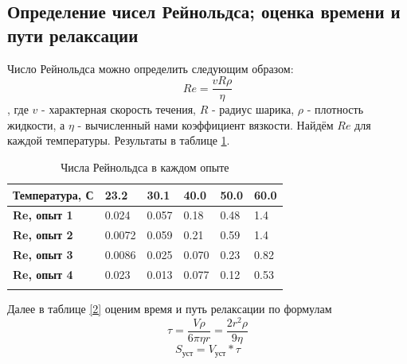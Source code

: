 \documentclass[a4paper]{article}
\begin{document}
\subsection{Определение чисел Рейнольдса; оценка времени и пути релаксации}
Число Рейнольдса можно определить следующим образом:
\begin{equation}
Re=\frac{v R \rho}{\eta}
\end{equation}, где $v$ - характерная скорость течения, $R$ - радиус шарика, $\rho$ - плотность жидкости, а $\eta$ - вычисленный нами коэффициент вязкости. Найдём $Re$ для каждой температуры. Результаты в таблице \ref{re}.
\begin{table}[h]
\begin{tabular}{llllll}
\hline
\multicolumn{1}{|r|}{\textbf{Температура, С}} & \multicolumn{1}{l|}{\textbf{23.2}} & \multicolumn{1}{l|}{\textbf{30.1}} & \multicolumn{1}{l|}{\textbf{40.0}} & \multicolumn{1}{l|}{\textbf{50.0}} & \multicolumn{1}{l|}{\textbf{60.0}} \\ \hline
\multicolumn{1}{|l|}{\textbf{Re, опыт 1}}     & \multicolumn{1}{l|}{0.024}         & \multicolumn{1}{l|}{0.057}         & \multicolumn{1}{l|}{0.18}          & \multicolumn{1}{l|}{0.48}          & \multicolumn{1}{l|}{1.4}           \\ \hline
\multicolumn{1}{|l|}{\textbf{Re, опыт 2}}     & \multicolumn{1}{l|}{0.0072}        & \multicolumn{1}{l|}{0.059}         & \multicolumn{1}{l|}{0.21}          & \multicolumn{1}{l|}{0.59}          & \multicolumn{1}{l|}{1.4}           \\ \hline
\multicolumn{1}{|l|}{\textbf{Re, опыт 3}}     & \multicolumn{1}{l|}{0.0086}        & \multicolumn{1}{l|}{0.025}         & \multicolumn{1}{l|}{0.070}         & \multicolumn{1}{l|}{0.23}          & \multicolumn{1}{l|}{0.82}          \\ \hline
\multicolumn{1}{|l|}{\textbf{Re, опыт 4}}     & \multicolumn{1}{l|}{0.023}         & \multicolumn{1}{l|}{0.013}         & \multicolumn{1}{l|}{0.077}         & \multicolumn{1}{l|}{0.12}          & \multicolumn{1}{l|}{0.53}          \\ \hline
\textbf{}                                     & \textbf{}                          & \textbf{}                          & \textbf{}                          & \textbf{}                          & \textbf{}                         
\end{tabular}
\caption{Числа Рейнольдса в каждом опыте}
\label{re}
\end{table}

Далее в таблице \ref{2} оценим время и путь релаксации по формулам 
\begin{equation}
\tau = \frac{V \rho}{6 \pi \eta r} = \frac{2 r^{2} \rho}{9 \eta}
\end{equation}
\begin{equation}
S_{уст} = V_{уст} * \tau
\end{equation}
\end{document}
